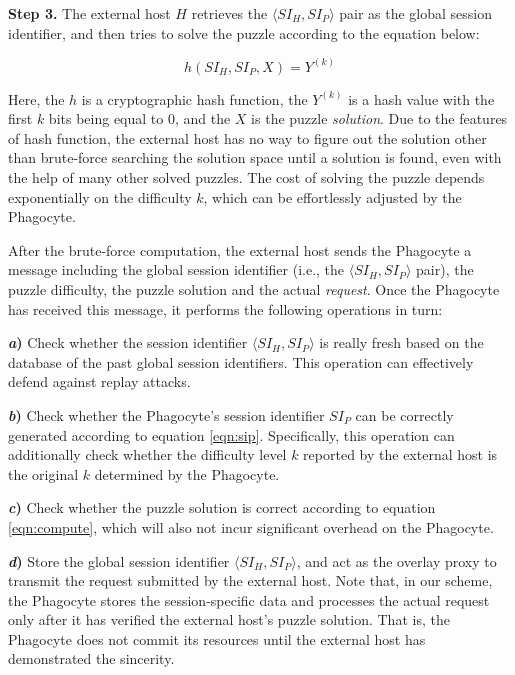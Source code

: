 \documentclass[times,10pt,twocolumn]{article}
\begin{document}
\textbf{Step 3.} The external host $H$ retrieves the $\langle SI_H,
SI_P \rangle$ pair as the global session identifier, and then tries
to solve the puzzle according to the equation below:

\begin{equation} \label{eqn:compute}
h \left( SI_H, SI_P, X \right) = Y^{ \left( k \right) }
\end{equation}

\noindent Here, the $h$ is a cryptographic hash function, the $Y^{
\left( k \right) }$ is a hash value with the first $k$ bits being
equal to $0$, and the $X$ is the puzzle \emph{solution}. Due to the
features of hash function, the external host has no way to figure
out the solution other than brute-force searching the solution space
until a solution is found, even with the help of many other solved
puzzles. The cost of solving the puzzle depends exponentially on the
difficulty $k$, which can be effortlessly adjusted by the Phagocyte.

After the brute-force computation, the external host sends the
Phagocyte a message including the global session identifier (i.e.,
the $\langle SI_H, SI_P \rangle$ pair), the puzzle difficulty, the
puzzle solution and the actual \emph{request}. Once the Phagocyte
has received this message, it performs the following operations in
turn:



\textbf{\emph{a})} Check whether the session identifier $\langle
SI_H, SI_P \rangle$ is really fresh based on the database of the
past global session identifiers. This operation can effectively
defend against replay attacks.


\textbf{\emph{b})} Check whether the Phagocyte's session identifier
$SI_P$ can be correctly generated according to equation
\ref{eqn:sip}. Specifically, this operation can additionally check
whether the difficulty level $k$ reported by the external host is
the original $k$ determined by the Phagocyte.


\textbf{\emph{c})} Check whether the puzzle solution is correct
according to equation \ref{eqn:compute}, which will also not incur
significant overhead on the Phagocyte.


\textbf{\emph{d})} Store the global session identifier $\langle
SI_H, SI_P \rangle$, and act as the overlay proxy to transmit the
request submitted by the external host. Note that, in our scheme,
the Phagocyte stores the session-specific data and processes the
actual request only after it has verified the external host's puzzle
solution. That is, the Phagocyte does not commit its resources until
the external host has demonstrated the sincerity.
\end{document}
